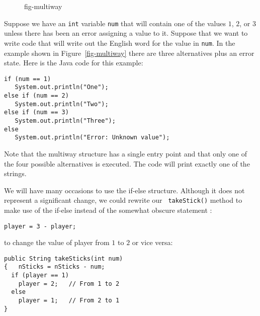 \begin{figure}[tb]
\figaleft{chptr03/multi.eps}{Flowchart of a nested if-else statement.
} {fig-multiway}
\end{figure}

Suppose we have an {\tt int} variable {\tt num} that will contain one
of the values $1$, $2$, or $3$ unless there has been an error assigning
a value to it. Suppose that we want to write code that will write out
the English word for the value in {\tt num}. In the example shown in
Figure~\ref{fig-multiway} there are three alternatives plus an error
state.  Here is the Java code for this example:

\begin{jjjlisting}
\begin{lstlisting}
if (num == 1)
   System.out.println("One");
else if (num == 2)
   System.out.println("Two");
else if (num == 3)
   System.out.println("Three");
else
   System.out.println("Error: Unknown value");
\end{lstlisting}
\end{jjjlisting}

\noindent Note that the multiway structure has a single
entry point and that only one of the four possible alternatives is
executed.  The code will print exactly one of the strings.

We will have many occasions to use the if-else structure.  Although it
does not represent a significant change, we could rewrite our {\tt
takeStick()} method to make use of the if-else instead of the somewhat
obscure statement :

\begin{jjjlisting}
\begin{lstlisting}
player = 3 - player;
\end{lstlisting}
\end{jjjlisting}

\noindent to change the value of player from $1$ to $2$ or vice versa:

\begin{jjjlisting}
\begin{lstlisting}
public String takeSticks(int num)
{   nSticks = nSticks - num;
  if (player == 1)
    player = 2;   // From 1 to 2
  else
    player = 1;   // From 2 to 1
}
\end{lstlisting}
\end{jjjlisting}

